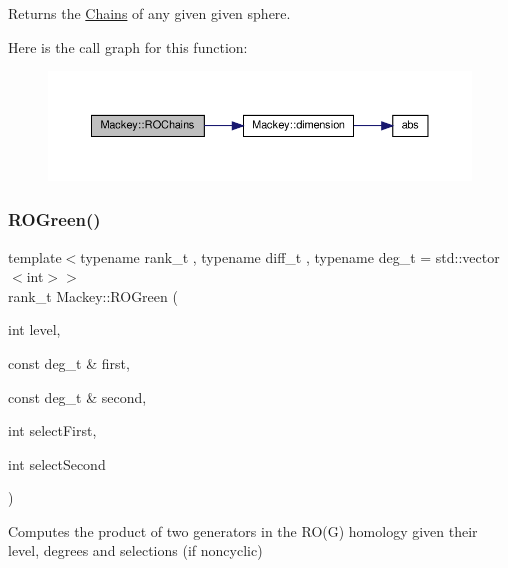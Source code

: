 Returns the \hyperlink{classMackey_1_1Chains}{Chains} of any given given sphere. 

Here is the call graph for this function\+:\nopagebreak
\begin{figure}[H]
\begin{center}
\leavevmode
\includegraphics[width=350pt]{namespaceMackey_abd3c2e12c91baa573c6dbaa37eeb0518_cgraph}
\end{center}
\end{figure}
\mbox{\label{namespaceMackey_a2bd86833844ca62d76c47a54aeb0bb77}} 
\subsubsection{\texorpdfstring{R\+O\+Green()}{ROGreen()}\hspace{0.1cm}{\footnotesize\ttfamily [1/2]}}
{\footnotesize\ttfamily template$<$typename rank\+\_\+t , typename diff\+\_\+t , typename deg\+\_\+t  = std\+::vector$<$int$>$$>$ \\
rank\+\_\+t Mackey\+::\+R\+O\+Green (\begin{DoxyParamCaption}\item[{int}]{level,  }\item[{const deg\+\_\+t \&}]{first,  }\item[{const deg\+\_\+t \&}]{second,  }\item[{int}]{select\+First,  }\item[{int}]{select\+Second }\end{DoxyParamCaption})}



Computes the product of two generators in the R\+O(\+G) homology given their level, degrees and selections (if noncyclic) 

